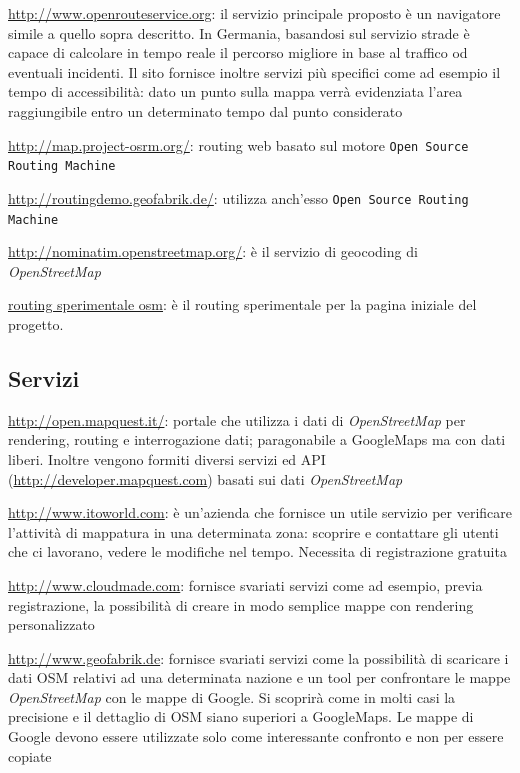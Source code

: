 \documentclass[a4paper,twoside,12pt,]{article}
\newcommand{\osm}{\emph{OpenStreetMap}\xspace}
\newcommand{\soft}[1]{\texttt{#1}}
\begin{document}
\url{http://www.openrouteservice.org}: il servizio principale proposto è un navigatore simile a quello sopra descritto. In Germania, basandosi sul servizio strade è capace di calcolare in tempo reale il percorso migliore in base al traffico od eventuali incidenti. Il sito fornisce inoltre servizi più specifici come ad esempio il tempo di accessibilità: dato un punto sulla mappa verrà evidenziata l'area raggiungibile entro un determinato tempo dal punto considerato

\url{http://map.project-osrm.org/}: routing web basato sul motore \soft{Open Source Routing Machine}

\url{http://routingdemo.geofabrik.de/}: utilizza anch'esso \soft{Open Source Routing Machine}

\url{http://nominatim.openstreetmap.org/}: è il servizio di geocoding di \osm

\href{http://nroets.dev.openstreetmap.org/demo/index.html?lat=42.8&lon=12.45&zoom=6&layers=B000FTFTT}{routing sperimentale osm}: è il routing sperimentale per la pagina iniziale del progetto.

\subsection{Servizi}

\url{http://open.mapquest.it/}: portale che utilizza i dati di \osm per rendering, routing e interrogazione dati; paragonabile a GoogleMaps ma con dati liberi. Inoltre vengono formiti diversi servizi ed API (\url{http://developer.mapquest.com}) basati sui dati \osm

\url{http://www.itoworld.com}: è un'azienda che fornisce un utile servizio per verificare l'attività di mappatura in una determinata zona: scoprire  e contattare gli utenti che ci lavorano, vedere le modifiche nel tempo. Necessita di registrazione gratuita

\url{http://www.cloudmade.com}: fornisce svariati servizi come ad esempio, previa registrazione, la possibilità di creare in modo semplice mappe con rendering personalizzato

\url{http://www.geofabrik.de}: fornisce svariati servizi come la possibilità di scaricare i dati OSM relativi ad una determinata nazione e un tool per confrontare le mappe \osm con le mappe di Google. Si scoprirà come in molti casi la precisione e il dettaglio di OSM siano superiori a GoogleMaps. Le mappe di Google devono essere utilizzate solo come interessante confronto e non per essere copiate
\end{document}
